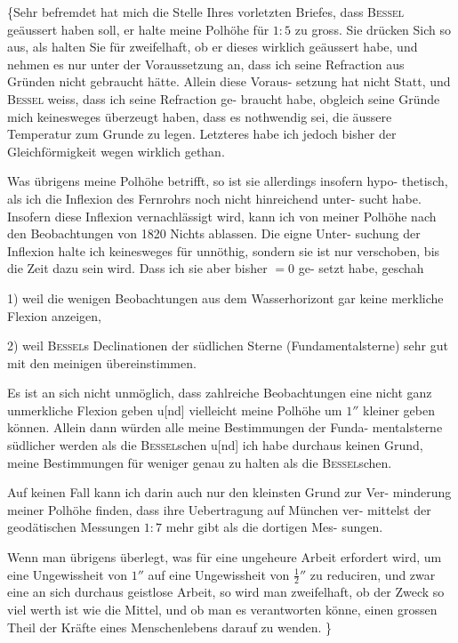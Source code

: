\documentclass[12pt,a4paper]{article}
\theoremstyle{plain}
\theoremstyle{definition}
\theoremstyle{remark}
\begin{document}
\medskip
\{\dotfill Sehr befremdet hat mich die Stelle Ihres vorletzten Briefes,
dass \textsc{Bessel} ge\"{a}ussert haben soll, er halte meine Polh\"{o}he f\"{u}r $1\!\!:\!\!5$ zu gross.
Sie dr\"{u}cken Sich so aus, als halten Sie f\"{u}r zweifelhaft, ob er dieses wirklich
ge\"{a}ussert habe, und nehmen es nur unter der Voraussetzung an, dass ich
seine Refraction aus Gr\"{u}nden nicht gebraucht h\"{a}tte. Allein diese Voraus-
setzung hat nicht Statt, und \textsc{Bessel} weiss, dass ich seine Refraction ge-
braucht habe, obgleich seine Gr\"{u}nde mich keinesweges \"{u}berzeugt haben, dass
es nothwendig sei, die \"{a}ussere Temperatur zum Grunde zu legen. Letzteres
habe ich jedoch bisher der Gleichf\"{o}rmigkeit wegen wirklich gethan.

Was \"{u}brigens meine Polh\"{o}he betrifft, so ist sie allerdings insofern hypo-
thetisch, als ich die Inflexion des Fernrohrs noch nicht hinreichend unter-
sucht habe. Insofern diese Inflexion vernachl\"{a}ssigt wird, kann ich von meiner
Polh\"{o}he nach den Beobachtungen von 1820 Nichts ablassen. Die eigne Unter-
suchung der Inflexion halte ich keinesweges f\"{u}r unn\"{o}thig, sondern sie ist nur
verschoben, bis die Zeit dazu sein wird. Dass ich sie aber bisher $= 0$ ge-
setzt habe, geschah

1) weil die wenigen Beobachtungen aus dem Wasserhorizont gar keine
merkliche Flexion anzeigen,

2) weil \textsc{Bessel}s Declinationen der s\"{u}dlichen Sterne (Fundamentalsterne)
sehr gut mit den meinigen \"{u}bereinstimmen.

Es ist an sich nicht unm\"{o}glich, dass zahlreiche Beobachtungen eine nicht
ganz unmerkliche Flexion geben u[nd] vielleicht meine Polh\"{o}he um $1''$ kleiner
geben k\"{o}nnen. Allein dann w\"{u}rden alle meine Bestimmungen der Funda-
mentalsterne s\"{u}dlicher werden als die \textsc{Bessel}schen u[nd] ich habe durchaus
keinen Grund, meine Bestimmungen f\"{u}r weniger genau zu halten als die
\textsc{Bessel}schen.

Auf keinen Fall kann ich darin auch nur den kleinsten Grund zur Ver-
minderung meiner Polh\"{o}he finden, dass ihre Uebertragung auf M\"{u}nchen ver-
mittelst der geod\"{a}tischen Messungen $1\!\!:\!\!7$ mehr gibt als die dortigen Mes-
sungen. \dotfill

Wenn man \"{u}brigens \"{u}berlegt, was f\"{u}r eine ungeheure Arbeit erfordert
wird, um eine Ungewissheit von $1''$ auf eine Ungewissheit von $\frac{1}{2}''$ zu reduciren,
und zwar eine an sich durchaus geistlose Arbeit, so wird man zweifelhaft, ob
der Zweck so viel werth ist wie die Mittel, und ob man es verantworten k\"{o}nne,
einen grossen Theil der Kr\"{a}fte eines Menschenlebens darauf zu wenden. \dotfill\}
\end{document}
